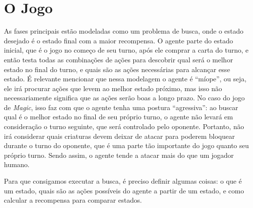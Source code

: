 \section{O Jogo}
As fases principais estão modeladas como um problema de busca, onde o estado desejado é o estado final com a maior recompensa. O agente parte do estado inicial, que é o jogo no começo de seu turno, após ele comprar a carta do turno, e então testa todas as combinações de ações para descobrir qual será o melhor estado no final do turno, e quais são as ações necessárias para alcançar esse estado. É relevante mencionar que nessa modelagem o agente é ``míope'', ou seja, ele irá procurar ações que levem ao melhor estado próximo, mas isso não necessariamente significa que as ações serão boas a longo prazo. No caso do jogo de \textit{Magic}, isso faz com que o agente tenha uma postura ``agressiva'': ao buscar qual é o melhor estado no final de seu próprio turno, o agente não levará em consideração o turno seguinte, que será controlado pelo oponente. Portanto, não irá considerar quais criaturas devem deixar de atacar para poderem bloquear durante o turno do oponente, que é uma parte tão importante do jogo quanto seu próprio turno. Sendo assim, o agente tende a atacar mais do que um jogador humano.

Para que consigamos executar a busca, é preciso definir algumas coisas: o que é um estado, quais são as ações possíveis do agente a partir de um estado, e como calcular a recompensa para comparar estados.

